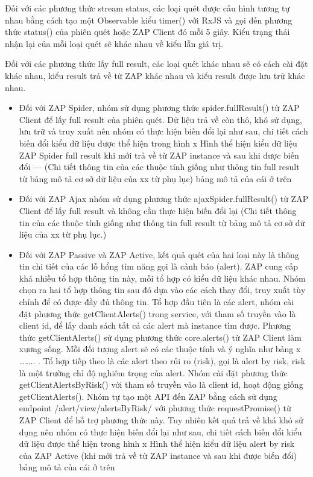 Đối với các phương thức stream status, các loại quét được cấu hình tương tự nhau bằng cách tạo một Observable kiểu timer() với RxJS và gọi đến phương thức status() của phiên quét hoặc ZAP Client đó mỗi 5 giây. Kiểu trạng thái nhận lại của mỗi loại quét sẽ khác nhau về kiểu lẫn giá trị.
\par

Đối với các phương thức lấy full result, các loại quét khác nhau sẽ có cách cài đặt khác nhau, kiểu result trả về từ ZAP khác nhau và kiểu result được lưu trữ khác nhau. 

\begin{itemize}
  \item Đối với ZAP Spider, nhóm sử dụng phương thức spider.fullResult() từ ZAP Client để lấy full result của phiên quét. Dữ liệu trả về còn thô, khó sử dụng, lưu trữ  và truy xuất nên nhóm có thực hiện biến đổi lại như sau, chi tiết cách biến đổi kiểu dữ liệu được thể hiện trong hình x Hình thể hiện kiểu dữ liệu ZAP Spider full result khi mới trả về từ ZAP instance và sau khi được biến đổi --- (Chi tiết thông tin của các thuộc tính giống như thông tin full result từ bảng mô tả cơ sở dữ liệu của xx từ phụ lục)
  bảng mô tả của cái ở trên
  \item Đối với ZAP Ajax nhóm sử dụng phương thức ajaxSpider.fullResult() từ ZAP Client để lấy full result và không cần thực hiện biến đổi lại (Chi tiết thông tin của các thuộc tính giống như thông tin full result từ bảng mô tả cơ sở dữ liệu của xx từ phụ lục.)
  \item Đối với ZAP Passive và ZAP Active, kết quả quét của hai loại này là thông tin chi tiết của các lỗ hổng tìm năng gọi là cảnh báo (alert). ZAP cung cấp khá nhiều tổ hợp thông tin này, mỗi tổ hợp có kiểu dữ liệu khác nhau. Nhóm chọn ra hai tổ hợp thông tin sau đó dựa vào các cách thay đổi, truy xuất tùy chỉnh để có được đầy đủ thông tin. Tổ hợp đầu tiên là các alert, nhóm cài đặt phương thức getClientAlerts() trong service, với tham số truyền vào là client id, để lấy danh sách tất cả các alert mà instance tìm được. Phương thức getClientAlerts() sử dụng phương thức core.alerts() từ ZAP Client làm xương sống. Mỗi đối tượng alert sẽ có các thuộc tính và ý nghĩa như bảng x …….. . Tổ hợp tiếp theo là các alert theo rủi ro (risk), gọi là alert by risk, risk là một trường chỉ độ nghiêm trọng của alert. Nhóm cài đặt phương thức getClientAlertsByRisk() với tham số truyền vào là client id, hoạt động giống getClientAlerts(). Nhóm tự tạo một API đến ZAP bằng cách sử dụng endpoint /alert/view/alertsByRisk/ với phương thức requestPromise() từ ZAP Client để hỗ trợ phương thức này. Tuy nhiên kết quả trả về khá khó sử dụng nên nhóm có thực hiện biến đổi lại như sau, chi tiết cách biến đổi kiểu dữ liệu được thể hiện trong hình x Hình thể hiện kiểu dữ liệu alert by risk của ZAP Active (khi mới trả về từ ZAP instance và sau khi được biến đổi)
  bảng mô tả của cái ở trên
\end{itemize}

